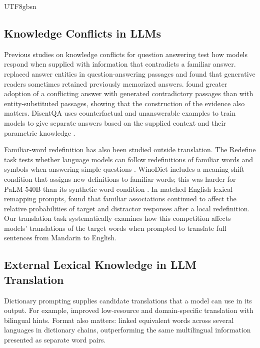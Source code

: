 \documentclass[11pt]{article}
\begin{document}
\begin{CJK*}{UTF8}{gbsn}
\subsection{Knowledge Conflicts in LLMs}
\label{sec:related-pk-ck}

Previous studies on knowledge conflicts for question answering test how models respond when supplied with information that contradicts a familiar answer. \citet{longpre2021entity} replaced answer entities in question-answering passages and found that generative readers sometimes retained previously memorized answers. \citet{xie2024adaptive} found greater adoption of a conflicting answer with generated contradictory passages than with entity-substituted passages, showing that the construction of the evidence also matters. DisentQA uses counterfactual and unanswerable examples to train models to give separate answers based on the supplied context and their parametric knowledge \citep{neeman2023disentqa}.

Familiar-word redefinition has also been studied outside translation. The Redefine task tests whether language models can follow redefinitions of familiar words and symbols when answering simple questions \citep{mckenzie2023inverse}. WinoDict includes a meaning-shift condition that assigns new definitions to familiar words; this was harder for PaLM-540B than its synthetic-word condition \citep{eisenschlos2023winodict}. In matched English lexical-remapping prompts, \citet{wang2026persistent} found that familiar associations continued to affect the relative probabilities of target and distractor responses after a local redefinition. Our translation task systematically examines how this competition affects models' translations of the target words when prompted to translate full sentences from Mandarin to English.

\subsection{External Lexical Knowledge in LLM Translation}
\label{sec:related-dictionary}

Dictionary prompting supplies candidate translations that a model can use in its output. For example, \citet{ghazvininejad2023dictionary} improved low-resource and domain-specific translation with bilingual hints. 
Format also matters: \citet{lu2024chain} linked equivalent words across several languages in dictionary chains, outperforming the same multilingual information presented as separate word pairs.


\end{CJK*}
\end{document}
